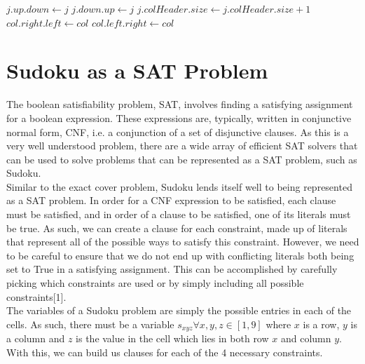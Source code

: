 \documentclass[12pt]{article}
\newcounter{row}
\newcounter{col}
\begin{document}
\begin{algorithm}[!ht]
\label{uncover}
\begin{algorithmic}
\State $j.up.down \gets j$
\State $j.down.up \gets j$
\State $j.colHeader.size \gets j.colHeader.size + 1$
\EndFor
\EndFor
\State $col.right.left \gets col$
\State $col.left.right \gets col$
\EndProcedure
\end{algorithmic}
\end{algorithm}

\section{Sudoku as a SAT Problem}
The boolean satisfiability problem, SAT, involves finding a satisfying assignment for a boolean expression. These expressions are, typically, written in conjunctive normal form, CNF, i.e. a conjunction of a set of disjunctive clauses. As this is a very well understood problem, there are a wide array of efficient SAT solvers that can be used to solve problems that can be represented as a SAT problem, such as Sudoku. \\

Similar to the exact cover problem, Sudoku lends itself well to being represented as a SAT problem. In order for a CNF expression to be satisfied, each clause must be satisfied, and in order of a clause to be satisfied, one of its literals must be true. As such, we can create a clause for each constraint, made up of literals that represent all of the possible ways to satisfy this constraint. However, we need to be careful to ensure that we do not end up with conflicting literals both being set to True in a satisfying assignment. This can be accomplished by carefully picking which constraints are used or by simply including all possible constraints[1]. \\

The variables of a Sudoku problem are simply the possible entries in each of the cells. As such, there must be a variable $s_{xyz} \forall x,y,z \in [1,9]$ where $x$ is a row, $y$ is a column and $z$ is the value in the cell which lies in both row $x$ and column $y$. With this, we can build us clauses for each of the 4 necessary constraints. \\
\end{document}
